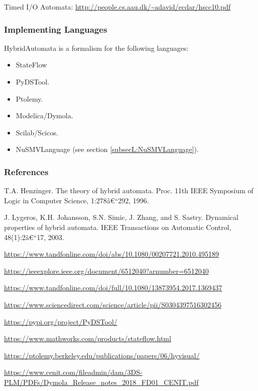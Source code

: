 Timed I/O Automata: \url{http://people.cs.aau.dk/~adavid/ecdar/hscc10.pdf}



\subsubsection{Implementing Languages} \label{HybridAutomata:Languages}

HybridAutomata is a formalism for the following languages:
\begin{itemize}
    \item StateFlow
	\item PyDSTool.
    \item Ptolemy.
    \item Modelica/Dymola.
    \item Scilab/Scicos. 
    \item NuSMVLanguage (see section \ref{subsecL:NuSMVLanguage}). %

\end{itemize}


\subsubsection{References} \label{HybridAutomata:References}

T.A. Henzinger. The theory of hybrid automata. Proc. 11th IEEE Symposium of Logic in Computer Science, 1:278â€“292, 1996.

J. Lygeros, K.H. Johansson, S.N. Simic, J. Zhang, and S. Sastry. Dynamical properties of hybrid automata. IEEE Transactions on Automatic Control, 48(1):2â€“17, 2003.


\url{https://www.tandfonline.com/doi/abs/10.1080/00207721.2010.495189}

\url{https://ieeexplore.ieee.org/document/6512040?arnumber=6512040}

\url{https://www.tandfonline.com/doi/full/10.1080/13873954.2017.1369437}

\url{https://www.sciencedirect.com/science/article/pii/S0304397516302456}

\url{https://pypi.org/project/PyDSTool/}

\url{https://www.mathworks.com/products/stateflow.html}

\url{https://ptolemy.berkeley.edu/publications/papers/06/hyvisual/}

\url{https://www.cenit.com/fileadmin/dam/3DS-PLM/PDFs/Dymola_Release_notes_2018_FD01_CENIT.pdf}

